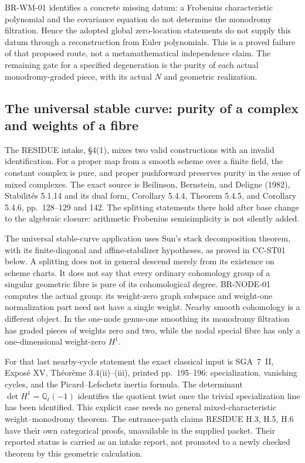 \documentclass[11pt,a4paper]{article}
\theoremstyle{definition}\newtheorem{definition}[theorem]{Definition}
\theoremstyle{remark}\newtheorem{remark}[theorem]{Remark}
\begin{document}
BR-WM-01 identifies a concrete missing datum: a Frobenius
characteristic polynomial and the covariance equation do not determine
the monodromy filtration. Hence the adopted global zero-location
statements do not supply this datum through a reconstruction from
Euler polynomials. This is a proved failure of that proposed route,
not a metamathematical independence claim. The remaining gate for a
specified degeneration is the purity of each actual monodromy-graded
piece, with its actual $N$ and geometric realization.

\subsection{The universal stable curve: purity of a complex and weights of a fibre}

The RESIDUE intake, \S4(1), mixes two valid constructions with an
invalid identification. For a proper map from a smooth scheme over
a finite field, the constant complex is pure, and proper pushforward
preserves purity in the sense of mixed complexes. The exact source is
Beilinson, Bernstein, and Deligne (1982), Stabilit\'es 5.1.14 and its dual
form, Corollary 5.4.4, Theorem 5.4.5, and Corollary 5.4.6,
pp.~128--129 and 142. The splitting statements there hold after
base change to the algebraic closure: arithmetic Frobenius
semisimplicity is not silently added.

The universal stable-curve application uses Sun's stack decomposition
theorem, with its finite-diagonal and affine-stabilizer hypotheses,
as proved in CC-ST01 below. A splitting does not in general descend
merely from its existence on scheme charts. It does not say that every ordinary
cohomology group of a singular geometric fibre is pure of its
cohomological degree. BR-NODE-01 computes the actual group: its
weight-zero graph subspace and weight-one normalization part need
not have a single weight. Nearby smooth cohomology is a different
object. In the one-node genus-one smoothing its monodromy filtration
has graded pieces of weights zero and two, while the nodal special
fibre has only a one-dimensional weight-zero $H^1$.

For that last nearby-cycle statement the exact classical input is
SGA~7~II, Expos\'e XV, Th\'eor\`eme 3.4(ii)--(iii), printed
pp.~195--196: specialization, vanishing cycles, and the
Picard--Lefschetz inertia formula. The determinant
$\det H^1=\mathbb Q_\ell(-1)$ identifies the quotient twist once
the trivial specialization line has been identified. This explicit
case needs no general mixed-characteristic weight--monodromy theorem.
The entrance-path claims RESIDUE H.3, H.5, H.6 have their own
categorical proofs, unavailable in the supplied packet. Their
reported status is carried as an intake report, not promoted to a
newly checked theorem by this geometric calculation.
\end{document}
